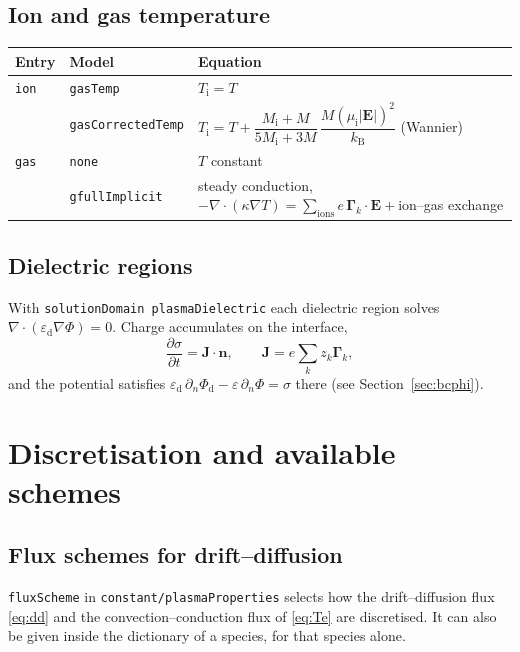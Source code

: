 \documentclass[11pt,a4paper]{article}
\newcommand{\kw}[1]{\texttt{#1}}
\newcommand{\bG}{\boldsymbol{\Gamma}}
\newcommand{\bE}{\mathbf{E}}
\newcommand{\bn}{\mathbf{n}}
\newcommand{\kB}{k_\mathrm{B}}
\newcommand{\pd}[2]{\frac{\partial #1}{\partial #2}}
\begin{document}
\subsection{Ion and gas temperature}

\begin{center}
\begin{tabular}{@{}llL{9cm}@{}}
\toprule
Entry & Model & Equation \\
\midrule
\kw{ion} & \kw{gasTemp} & $T_\mathrm{i}=T$ \\
 & \kw{gasCorrectedTemp} & $T_\mathrm{i}=T+\dfrac{M_\mathrm{i}+M}{5M_\mathrm{i}+3M}\,\dfrac{M(\mu_\mathrm{i}|\bE|)^2}{\kB}$ (Wannier) \\[6pt]
\kw{gas} & \kw{none} & $T$ constant \\
 & \kw{gfullImplicit} & steady conduction, $-\nabla\cdot(\kappa\nabla T)=\sum_\mathrm{ions} e\,\bG_k\cdot\bE + {}$ion--gas exchange \\
\bottomrule
\end{tabular}
\end{center}

\subsection{Dielectric regions}

With \kw{solutionDomain plasmaDielectric} each dielectric region solves
$\nabla\cdot(\varepsilon_\mathrm{d}\nabla\Phi)=0$. Charge accumulates on the
interface,
\begin{equation}
\pd{\sigma}{t} = \mathbf{J}\cdot\bn ,\qquad \mathbf{J}=e\sum_k z_k\bG_k ,
\label{eq:sigma}
\end{equation}
and the potential satisfies
$\varepsilon_\mathrm{d}\,\partial_n\Phi_\mathrm{d}-\varepsilon\,\partial_n\Phi=\sigma$
there (see Section~\ref{sec:bcphi}).

\section{Discretisation and available schemes}

\subsection{Flux schemes for drift--diffusion}

\kw{fluxScheme} in \kw{constant/plasmaProperties} selects how the
drift--diffusion flux \eqref{eq:dd} and the convection--conduction flux of
\eqref{eq:Te} are discretised. It can also be given inside the dictionary of
a species, for that species alone.
\end{document}
